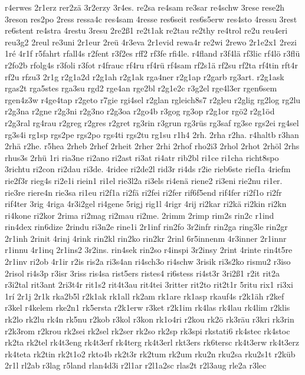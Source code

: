 {r4erwes
2r1erz
rer2zä
3r2erzy
3r4es.
re2sa
re4sam
re3sar
re4schw
3rese
rese2h
3reson
res2po
2ress
ressa4c
res4sam
4resse
res6seit
res6s5erw
res4sto
4ressu
3rest
re6stent
re4stra
4restu
3resu
2re2ß1
re2t1ak
re2tau
re2thy
re4trol
re2u
reu4eri
reu3g2
2reul
re3uni
2r1eur
2reü
4r3eva
2r1evid
rewa4r
re2wi
2rewo
2r1e2x1
2rezi
1ré
4r1f
r5fahrt
rfall4s
r2fent
r3f2es
rff2
rf3fe
rfi4le.
r4fland
r3f4lä
rf3lic
rf4lö
r3flü
r2fo2b
rfolg4s
r3foli
r3fot
r4frauc
rf4ru
rf4rü
rf4sam
rf2s1ä
rf2su
rf2ta
rf4tin
rft4r
rf2u
rfzu3
2r1g
r2g1a2d
r2g1ah
r2g1ak
rga4ner
r2g1ap
r2garb
rg3art.
r2g1ask
rgas2t
rga5stes
rga3su
rgd2
rge4an
rge2bl
r2g1e2c
r3g2el
rge4l3er
rgen6sem
rgen4z3w
r4ge4tap
r2geto
r7gie
rgi4sel
r2glan
rgleich8s7
r2gleu
r2glig
rg2log
rg2lu
r2g3na
r2gne
r2g3ni
r2g3no
r2g3oa
r2go4b
r3gog
rg3op
r2g1or
rgö2
r2g1öd
r2g3ral
rg4rau
r2greg
r2gres
r2gret
rg3rin
r3grun
rg3rüs
rg3saf
rg3se
rgs2ei
rg4sel
rg3s4i
rg1sp
rgs2pe
rgs2po
rgs4ti
rgs2tu
rg1su
r1h4
2rh.
2rha
r2ha.
r4haltb
r3han
2rhä
r2he.
r5hea
2rheb
2rhef
2rheit
2rher
2rhi
2rhof
rho2i3
2rhol
2rhot
2rhöl
2rhs
rhus3s
2rhü
1ri
ria3ne
ri2ano
ri2ast
ri3at
ri4atr
rib2bl
ri1ce
ri1cha
richt8spo
3richtu
ri2con
ri2dau
ri3de.
4ridee
ri2de2l
rid3r
ri4ds
r2ie
rieb6ste
rief1a
4riefm
rie2f3r
rieg4s
ri2e1i
riein1
ri1el
rie3l2a
ri3els
ri4enä
riene2
ri3eni
rie2nu
ri1er.
rie3re
riere4n
rie3sa
ri1eu
ri2f1a
ri2fä
ri2fei
ri2fer
rif6f5end
rif4fer
ri2f1o
ri2fr
rif4ter
3rig
4riga
4r3i2gel
ri4gene
5rigj
rig1l
4rigr
4rij
ri2kar
ri2kä
ri2kin
ri2kn
ri4kone
ri2kor
2rima
ri2mag
ri2mau
ri2me.
2rimm
2rimp
rim2s
rin2c
r1ind
rin4dex
rin6dize
2rindu
ri3n2e
rine1i
2r1inf
rin2fo
3r2infr
rin2ga
ring3le
rin2gr
2r1inh
2rinit
4rinj
4rink
rin2kl
rin2ko
rin2kr
2rinl
6r5innenm
4r3inner
2r1innr
r1innu
4r1inq
2r1ins2
3r2ins.
rin4sek
rin2so
r4inspi
3r2insy
2rint
4rinte
rin4t5re
2r1inv
ri2ob
4r1ir
r2is
ris2a
ri3s4an
ri4sch3o
ri4schw
3risik
ri3s2ko
rismu2
r3iso
2risol
ri4s3p
r3isr
3riss
ris4sa
rist5ers
ristes4
ri6stess
ri4st3r
3ri2ß1
r2it
rit2a
r3i2tal
rit3ant
2ri3t4r
rit1s2
rit4t3au
rit4tei
3ritter
rit2to
rit2t1r
5ritu
rix1
ri3xi
1rí
2r1j
2r1k
rka2b5l
r2k1ak
rk1all
rk2am
rk1are
rk1asp
rkauf4s
r2k1äh
r2kef
r3kel
r4kelem
rke2n1
rk5ersta
r2k1erw
r3ket
r2k1im
rk4las
rk4lau
rk4lim
r2klis
rk2lo
rk2lu
rk4n
rk5nu
r2kob
r3kol
r3kon
rk1o4ri
r2kou
rk2ö
rk3räu
r3kri
rk3rin
r2k3rom
r2krou
rk2sei
rk2sel
rk2ser
rk2so
rk2sp
rk3spi
rkstati6
rk4stec
rk4stoc
rk2ta
rk2tel
rk4t3eng
rk4t3erf
rk4terg
rk4t3erl
rkt3ers
rk6tersc
rk4t3erw
rk4t3erz
rk4teta
rk2tin
rk2t1o2
rkto4b
rk2t3r
rk2tum
rk2um
rku2n
rku2sa
rku2s1t
r2küb
2r1l
rl2ab
r3lag
r5land
rlan4d3i
r2l1ar
r2l1a2sc
rlas2t
r2l3aug
rle2a
r3lec
}
